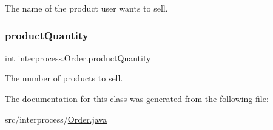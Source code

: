 The name of the product user wants to sell. \mbox{\label{classinterprocess_1_1_order_a471467d213a750ba99fc21e9d468fe98}} 
\subsubsection{\texorpdfstring{product\+Quantity}{productQuantity}}
{\footnotesize\ttfamily int interprocess.\+Order.\+product\+Quantity\hspace{0.3cm}{\ttfamily [private]}}

The number of products to sell. 

The documentation for this class was generated from the following file\+:\begin{DoxyCompactItemize}
\item 
src/interprocess/\hyperlink{_order_8java}{Order.\+java}\end{DoxyCompactItemize}
